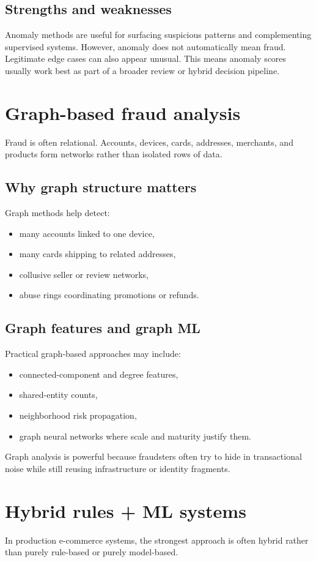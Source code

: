 \subsection{Strengths and weaknesses}
Anomaly methods are useful for surfacing suspicious patterns and complementing supervised systems.
However, anomaly does not automatically mean fraud.
Legitimate edge cases can also appear unusual.
This means anomaly scores usually work best as part of a broader review or hybrid decision pipeline.

\section{Graph-based fraud analysis}
Fraud is often relational.
Accounts, devices, cards, addresses, merchants, and products form networks rather than isolated rows of data.

\subsection{Why graph structure matters}
Graph methods help detect:
\begin{itemize}
  \item many accounts linked to one device,
  \item many cards shipping to related addresses,
  \item collusive seller or review networks,
  \item abuse rings coordinating promotions or refunds.
\end{itemize}

\subsection{Graph features and graph ML}
Practical graph-based approaches may include:
\begin{itemize}
  \item connected-component and degree features,
  \item shared-entity counts,
  \item neighborhood risk propagation,
  \item graph neural networks where scale and maturity justify them.
\end{itemize}

Graph analysis is powerful because fraudsters often try to hide in transactional noise while still reusing infrastructure or identity fragments.

\section{Hybrid rules + ML systems}
In production e-commerce systems, the strongest approach is often hybrid rather than purely rule-based or purely model-based.

